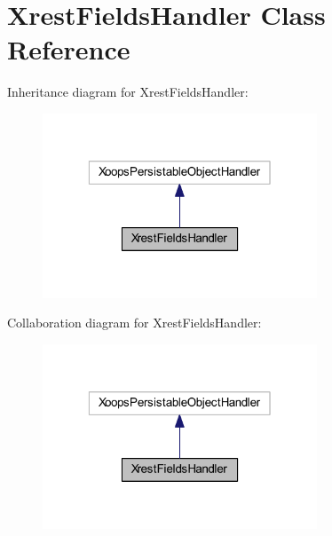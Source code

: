 \hypertarget{class_xrest_fields_handler}{\section{Xrest\-Fields\-Handler Class Reference}
\label{class_xrest_fields_handler}
}


Inheritance diagram for Xrest\-Fields\-Handler\-:
\nopagebreak
\begin{figure}[H]
\begin{center}
\leavevmode
\includegraphics[width=232pt]{class_xrest_fields_handler__inherit__graph}
\end{center}
\end{figure}


Collaboration diagram for Xrest\-Fields\-Handler\-:
\nopagebreak
\begin{figure}[H]
\begin{center}
\leavevmode
\includegraphics[width=232pt]{class_xrest_fields_handler__coll__graph}
\end{center}
\end{figure}
